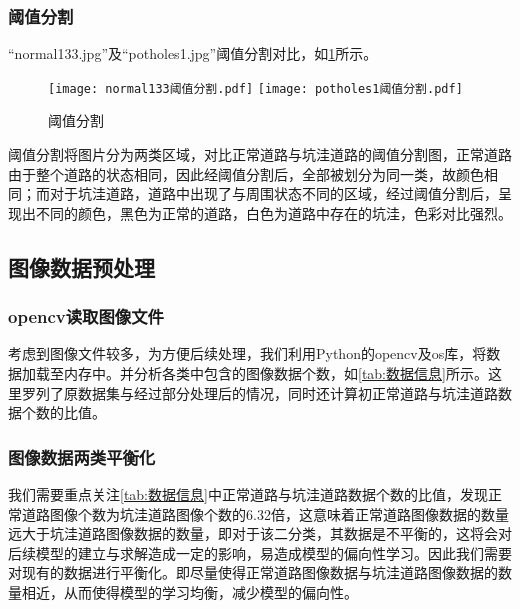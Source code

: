 \documentclass{MathorCupmodeling}
\begin{document}
	\subsubsection{阈值分割}
	“normal133.jpg”及“potholes1.jpg”阈值分割对比，如\textcolor{blue}{\cref{fig:阈值分割}}所示。
	\begin{figure}[H]
		\centering
		\texttt{[image: normal133阈值分割.pdf]}
		\hspace{0.3in}
		\texttt{[image: potholes1阈值分割.pdf]}
		\caption{阈值分割}
		\label{fig:阈值分割}
	\end{figure}
	阈值分割将图片分为两类区域，对比正常道路与坑洼道路的阈值分割图，正常道路由于整个道路的状态相同，因此经阈值分割后，全部被划分为同一类，故颜色相同；而对于坑洼道路，道路中出现了与周围状态不同的区域，经过阈值分割后，呈现出不同的颜色，黑色为正常的道路，白色为道路中存在的坑洼，色彩对比强烈。

	\subsection{图像数据预处理}
	\subsubsection{opencv读取图像文件}
	考虑到图像文件较多，为方便后续处理，我们利用Python的opencv及os库，将数据加载至内存中。并分析各类中包含的图像数据个数，如\textcolor{blue}{\cref{tab:数据信息}}所示。这里罗列了原数据集与经过\textcolor{blue}{}部分处理后的情况，同时还计算初正常道路与坑洼道路数据个数的比值。

\begin{table}[H]
	\centering
	\caption{数据信息}
	\label{tab:数据信息}
\end{table}
	
	\subsubsection{图像数据两类平衡化}
	我们需要重点关注\textcolor{blue}{\cref{tab:数据信息}}中正常道路与坑洼道路数据个数的比值，发现正常道路图像个数为坑洼道路图像个数的6.32倍，这意味着正常道路图像数据的数量远大于坑洼道路图像数据的数量，即对于该二分类，其数据是不平衡的，这将会对后续模型的建立与求解造成一定的影响，易造成模型的偏向性学习。因此我们需要对现有的数据进行平衡化。即尽量使得正常道路图像数据与坑洼道路图像数据的数量相近，从而使得模型的学习均衡，减少模型的偏向性。
\end{document}
